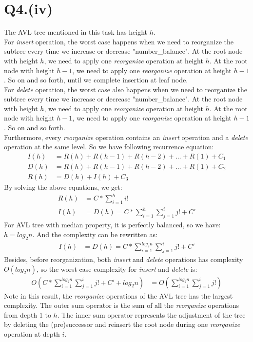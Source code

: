 \documentclass{article}
\begin{document}
\section*{Q4.(iv)}
    The AVL tree mentioned in this task has height $h$.\\
    For \emph{insert} operation, the worst case happens when we need to reorganize the subtree every time we increase or decrease "number\_balance".
    At the root node with height $h$, we need to apply one \emph{reorganize} operation at height $h$. At the root node with height $h-1$, we need to 
    apply one \emph{reorganize} operation at height $h-1$. So on and so forth, until we complete insertion at leaf node.\\
    For \emph{delete} operation, the worst case also happens when we need to reorganize the subtree every time we increase or decrease 
    "number\_balance". At the root node with height $h$, we need to apply one \emph{reorganize} operation at height $h$. At the root node with height 
    $h-1$, we need to apply one \emph{reorganize} operation at height $h-1$. So on and so forth.\\
    Furthermore, every \emph{reorganize} operation contains an \emph{insert} operation and a \emph{delete} operation at the same level. 
    So we have following recurrence equation:
\begin{align*}
    I(h) &= R(h) + R(h-1) + R(h-2) + \ldots + R(1) + C_{1}\\
    D(h) &= R(h) + R(h-1) + R(h-2) + \ldots + R(1) + C_{2}\\
    R(h) &= D(h) + I(h) + C_{3}
\end{align*}
    By solving the above equations, we get:
\begin{align*}
    R(h) &= C * \sum_{i = 1}^{h} i!\\
    I(h) &= D(h) = C * \sum_{i = 1}^{h} \sum_{j = 1}^{i} j! + C'
\end{align*}
    For AVL tree with median property, it is perfectly balanced, so we have: $h = log_{2}n$. And the complexity can be rewritten as:
\begin{align*}
    I(h) &= D(h) = C * \sum_{i = 1}^{log_{2}n} \sum_{j = 1}^{i} j! + C'
\end{align*}
    Besides, before reorganization, both \emph{insert} and \emph{delete} operations has complexity $O(log_{2}n)$, so the worst case complexity for 
    \emph{insert} and \emph{delete} is:
\begin{align*}
    O(C * \sum_{i = 1}^{log_{2}n} \sum_{j = 1}^{i} j! + C' + log_{2}n)
    &= O(\sum_{i = 1}^{log_{2}n} \sum_{j = 1}^{i} j!)
\end{align*}
    Note in this result, the \emph{reorganize} operations of the AVL tree has the largest complexity. The outer sum operator is the sum of 
    all the \emph{reorganize} operations from depth 1 to $h$. The inner sum operator represents the adjustment of the tree by deleting the 
    (pre)successor and reinsert the root node during one \emph{reorganize} operation at depth $i$.
\end{document}
